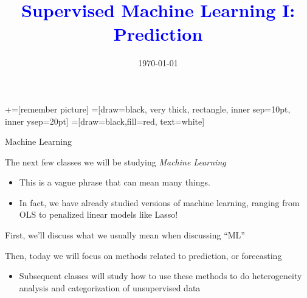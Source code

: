 \documentclass[notes,11pt, aspectratio=169]{beamer}
\title[]{\textcolor{blue}{Supervised Machine Learning I: Prediction}} \author[PGP]{}
\institute[FRBNY]{\small{\begin{tabular}{c}
                           Paul Goldsmith-Pinkham  \\
\end{tabular}}}
\date{\today}
\newenvironment{wideitemize}{\itemize\addtolength{\itemsep}{10pt}}{\enditemize}
\begin{document}
\newcommand\marktopleft[1]{%
    \tikz[overlay,remember picture] 
        \node (marker-#1-a) at (-.3em,.3em) {};%
}
\newcommand\markbottomright[2]{%
    \tikz[overlay,remember picture] 
        \node (marker-#1-b) at (0em,0em) {};%
}
+=[remember picture] 
 =[draw=black, very thick, rectangle, inner sep=10pt, inner ysep=20pt]
 =[draw=black,fill=red, text=white]

\begin{frame}
\maketitle
\end{frame}

\begin{frame}{Machine Learning}
  \begin{wideitemize}
  \item The next few classes we will be studying \emph{Machine Learning}
    \begin{itemize}
    \item This is a vague phrase that can mean many things.
    \item In fact, we have already studied versions of machine learning, ranging from OLS to penalized linear models like Lasso!
    \end{itemize}
  \item First, we'll discuss what we usually mean when discussing ``ML''
  \item Then, today we will focus on methods related to prediction, or forecasting
    \begin{itemize}
    \item Subsequent classes will study how to use these methods to do
      heterogeneity analysis and categorization of unsupervised data
    \end{itemize}
  \end{wideitemize}
\end{frame}
\end{document}
